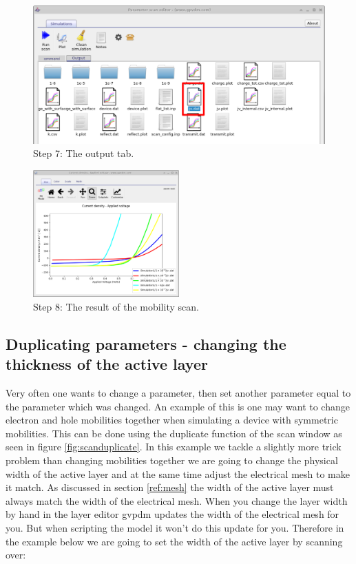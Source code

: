 \begin{figure}[H]
\centering
\includegraphics[width=\textwidth]{./images/param_scan_output.png}
\caption{Step 7: The output tab.}
\label{fig:scanoutput}
\end{figure}

\begin{figure}[H]
\centering
\includegraphics[width=0.5\textwidth]{./images/param_scan_jv.png}
\caption{Step 8: The result of the mobility scan.}
\label{fig:scanjv}
\end{figure}

\subsection{Duplicating parameters - changing the thickness of the active layer}

Very often one wants to change a parameter, then set another parameter equal to the parameter which was changed. An example of this is one may want to change electron and hole mobilities together when simulating a device with symmetric mobilities. This can be done using the duplicate function of the scan window as seen in figure \ref{fig:scanduplicate}.  In this example we tackle a slightly more trick problem than changing mobilities together we are going to change the physical width of the active layer and at the same time adjust the electrical mesh to make it match.  As discussed in section \ref{ref:mesh} the width of the active layer must always match the width of the electrical mesh.  When you change the layer width by hand in the layer editor gvpdm updates the width of the electrical mesh for you. But when scripting the model it won't do this update for you.  Therefore in the example below we are going to set the width of the active layer by scanning over:

